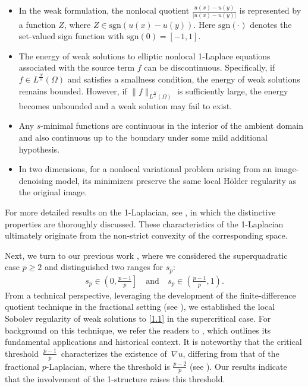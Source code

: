 \documentclass[reqno,10pt]{amsart}
\numberwithin{equation}{section}
\begin{document}
\begin{itemize}
	\item In the weak formulation, the nonlocal quotient $\frac{u(x)-u(y)}{|u(x)-u(y)|}$ is represented by a function $Z$, where $Z\in \mathrm{sgn}(u(x)-u(y))$. Here $\mathrm{sgn}(\cdot)$ denotes the set-valued sign function with $\mathrm{sgn}(0)=[-1, 1]$.
	
	\item The energy of weak solutions to elliptic nonlocal 1-Laplace equations associated with the source term $f$ can be discontinuous. Specifically, if $f\in L^\frac{N}{s}(\Omega)$ and satisfies a smallness condition, the energy of weak solutions remains bounded. However, if $\|f\|_{L^\frac{N}{s}(\Omega)}$ is sufficiently large, the energy becomes unbounded and a weak solution may fail to exist.
	
	\item Any $s$-minimal functions are continuous in the interior of the ambient domain and also continuous up to the boundary under some mild additional
	hypothesis. 
	
	\item In two dimensions, for a nonlocal variational problem arising from an image-denoising model, its minimizers preserve the same local H\"{o}lder regularity as the original image.
\end{itemize}
For more detailed results on the 1-Laplacian, see \cite{MRT16, MPRT16, AMRT08, AMRT09, MRT19, B23, BDLM23, BDLV25, NO23},
in which the distinctive properties are thoroughly discussed. These characteristics of the 1-Laplacian ultimately originate from the non-strict convexity of the corresponding space.

Next, we turn to our previous work \cite{LZ25}, where we considered the superquadratic case $p\ge 2$ and distinguished two ranges for $s_p$:
\begin{align*}
	s_p\in \left( 0,\frac{p-1}{p}\right]  \quad\text{and}\quad s_p\in \left( \frac{p-1}{p}, 1\right) .
\end{align*}
From a technical perspective, leveraging the development of the finite-difference quotient technique in the fractional setting (see \cite{BL17, BLS18, BDL2401, BDL2402, FLZ25, DKLN23, GL24}), we established the local Sobolev regularity of weak solutions to \eqref{1.1} in the supercritical case. For background on this technique, we refer the readers to \cite{L19}, which outlines its fundamental applications and historical context. It is noteworthy that the critical threshold $\frac{p-1}{p}$ characterizes the existence of $\nabla u$, differing from that of the fractional $p$-Laplacian, where the threshold is $\frac{p-2}{p}$ (see \cite{BDL2402}). Our results indicate that the involvement of the 1-structure raises this threshold.
\end{document}
